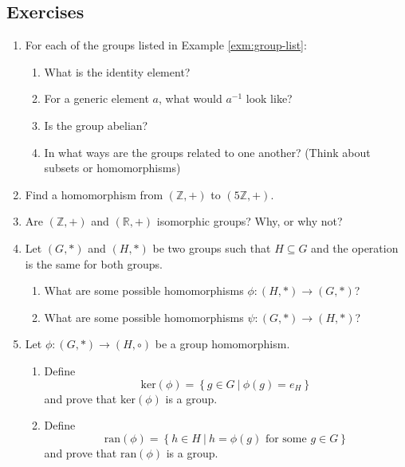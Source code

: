 \documentclass[
]{book}
\providecommand{\tightlist}{%
  \setlength{\itemsep}{0pt}\setlength{\parskip}{0pt}}
\theoremstyle{definition}
\theoremstyle{definition}
\theoremstyle{definition}
\theoremstyle{definition}
\theoremstyle{remark}
\begin{document}
\hypertarget{exercises-20}{%
\subsection{Exercises}\label{exercises-20}}

\begin{enumerate}
\def\labelenumi{\arabic{enumi}.}
\item
  For each of the groups listed in Example \ref{exm:group-list}:

  \begin{enumerate}
  \def\labelenumii{\alph{enumii}.}
  \item
    What is the identity element?
  \item
    For a generic element \(a\), what would \(a^{-1}\) look like?
  \item
    Is the group abelian?
  \item
    In what ways are the groups related to one another? (Think about subsets or homomorphisms)
  \end{enumerate}
\item
  Find a homomorphism from \(\left(\mathbb{Z}, +\right)\) to \(\left(5\mathbb{Z}, +\right)\).
\item
  Are \((\mathbb{Z},+)\) and \((\mathbb{R},+)\) isomorphic groups? Why, or why not?
\item
  Let \((G,*)\) and \((H,*)\) be two groups such that \(H\subseteq G\) and the operation is the same for both groups.

  \begin{enumerate}
  \def\labelenumii{\alph{enumii}.}
  \item
    What are some possible homomorphisms \(\phi:(H,*)\rightarrow (G,*)\)?
  \item
    What are some possible homomorphisms \(\psi:(G,*) \rightarrow (H,*)\)?
  \end{enumerate}
\item
  Let \(\phi:(G,*)\rightarrow (H,\circ)\) be a group homomorphism.

  \begin{enumerate}
  \def\labelenumii{\alph{enumii}.}
  \tightlist
  \item
    Define \[\mbox{ker}(\phi)= \left\{g\in G \: \vert \: \phi(g)=e_H\right\}\] and prove that \(\mbox{ker}(\phi)\) is a group.
  \item
    Define \[\mbox{ran}(\phi) = \left\{h\in H\: \vert \: h=\phi(g) \mbox{ for some } g\in G\right\}\] and prove that \(\mbox{ran}(\phi)\) is a group.
  \end{enumerate}
\end{enumerate}
\end{document}
